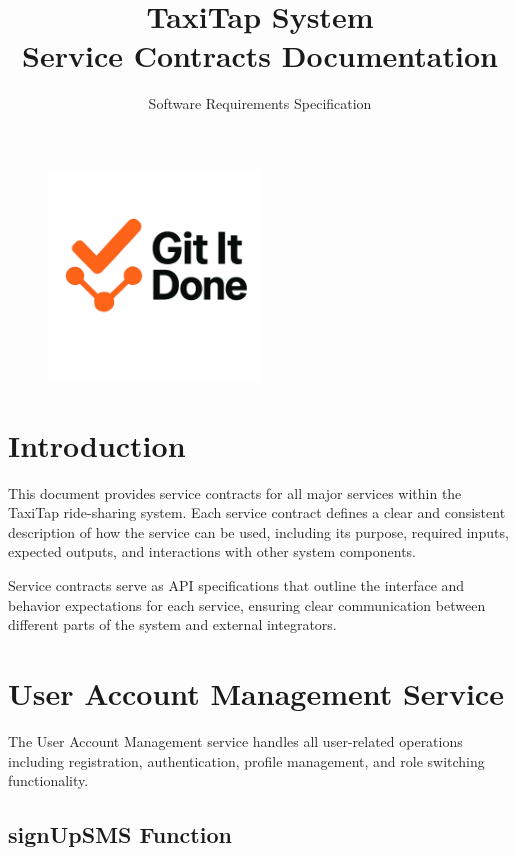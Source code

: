 \documentclass[11pt,a4paper]{article}
\title{TaxiTap System\\Service Contracts Documentation}
\author{Software Requirements Specification}
\date{}
\begin{document}
\maketitle

\begin{figure}[H]
  \centering
  \includegraphics[width=0.5\textwidth]{LogoGroup.png} 
\end{figure}

\newpage

\tableofcontents
\newpage

\section{Introduction}

This document provides service contracts for all major services within the TaxiTap ride-sharing system. Each service contract defines a clear and consistent description of how the service can be used, including its purpose, required inputs, expected outputs, and interactions with other system components.

Service contracts serve as API specifications that outline the interface and behavior expectations for each service, ensuring clear communication between different parts of the system and external integrators.

\section{User Account Management Service}

The User Account Management service handles all user-related operations including registration, authentication, profile management, and role switching functionality.

\subsection{signUpSMS Function}
\end{document}
